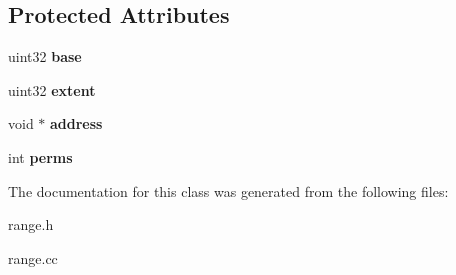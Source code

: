 \subsection*{Protected Attributes}
\begin{DoxyCompactItemize}
\item 
\hypertarget{classRange_a4086c61cc8ad865a384f469efd86bf65}{
uint32 {\bfseries base}}
\label{classRange_a4086c61cc8ad865a384f469efd86bf65}

\item 
\hypertarget{classRange_a760eb4f06062a8ac89bafc956b2639a2}{
uint32 {\bfseries extent}}
\label{classRange_a760eb4f06062a8ac89bafc956b2639a2}

\item 
\hypertarget{classRange_a6b5d02990f5f9e483e48bcd69047093b}{
void $\ast$ {\bfseries address}}
\label{classRange_a6b5d02990f5f9e483e48bcd69047093b}

\item 
\hypertarget{classRange_a360eeae0c0bdf8b0095c879c9f4cb111}{
int {\bfseries perms}}
\label{classRange_a360eeae0c0bdf8b0095c879c9f4cb111}

\end{DoxyCompactItemize}


The documentation for this class was generated from the following files:\begin{DoxyCompactItemize}
\item 
range.h\item 
range.cc\end{DoxyCompactItemize}
